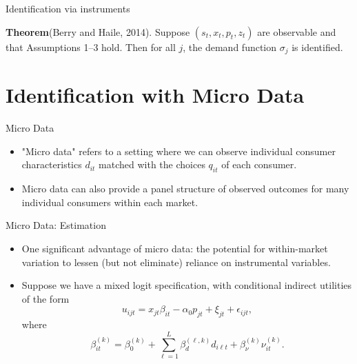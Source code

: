 \documentclass[aspectratio=169]{beamer}  %
\begin{document}
\begin{frame}{Identification via instruments}
    \begin{block}{\textbf{Theorem}(Berry and Haile, 2014).}
       Suppose \((s_t, x_t, p_t, z_t)\) are observable and that Assumptions 1--3 hold. Then for all \(j\), the demand function \(\sigma_j\) is identified.
    \end{block}

\end{frame}

\section{Identification with Micro Data}
\begin{frame}{Micro Data}
    \begin{itemize}
        \item "Micro data" refers to a setting where we can observe individual consumer characteristics \(d_{it}\) matched with the choices \(q_{it}\) of each consumer.
        \item Micro data can also provide a panel structure of observed outcomes for many individual consumers within each market.
    \end{itemize}
\end{frame}


\begin{frame}{Micro Data: Estimation}
    \begin{itemize}
        \item One significant advantage of micro data: the potential for within-market variation to lessen (but not eliminate) reliance on instrumental variables.
        \item Suppose we have a mixed logit specification, with conditional indirect utilities of the form
    \begin{equation}
        u_{ijt} = x_{jt}\beta_{it} - \alpha_0 p_{jt} + \xi_{jt} + \epsilon_{ijt},
    \end{equation}
    where
    \begin{equation}
        \beta_{it}^{(k)} = \beta_0^{(k)} + \sum_{\ell=1}^L \beta_d^{(\ell, k)} d_{i\ell t} + \beta_\nu^{(k)} \nu_{it}^{(k)}.
    \end{equation}
    \end{itemize}
    \end{frame}
    
\end{document}
